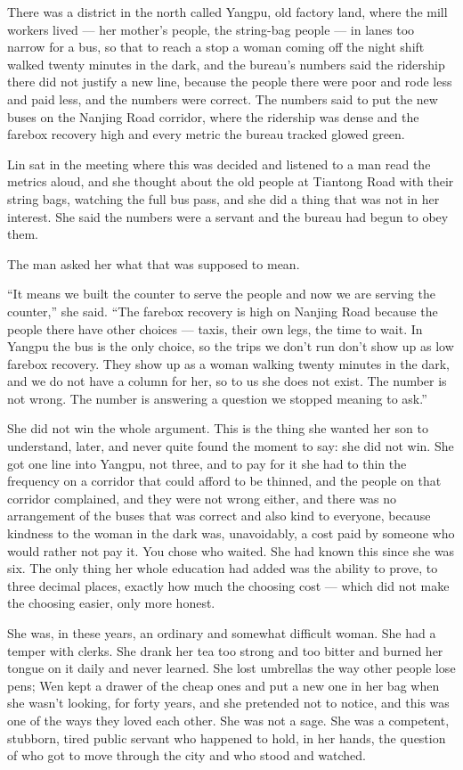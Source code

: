 There was a district in the north called Yangpu, old factory land, where the mill workers lived --- her mother's people, the string-bag people --- in lanes too narrow for a bus, so that to reach a stop a woman coming off the night shift walked twenty minutes in the dark, and the bureau's numbers said the ridership there did not justify a new line, because the people there were poor and rode less and paid less, and the numbers were correct. The numbers said to put the new buses on the Nanjing Road corridor, where the ridership was dense and the farebox recovery high and every metric the bureau tracked glowed green.

Lin sat in the meeting where this was decided and listened to a man read the metrics aloud, and she thought about the old people at Tiantong Road with their string bags, watching the full bus pass, and she did a thing that was not in her interest. She said the numbers were a servant and the bureau had begun to obey them.

The man asked her what that was supposed to mean.

``It means we built the counter to serve the people and now we are serving the counter,'' she said. ``The farebox recovery is high on Nanjing Road because the people there have other choices --- taxis, their own legs, the time to wait. In Yangpu the bus is the only choice, so the trips we don't run don't show up as low farebox recovery. They show up as a woman walking twenty minutes in the dark, and we do not have a column for her, so to us she does not exist. The number is not wrong. The number is answering a question we stopped meaning to ask.''

She did not win the whole argument. This is the thing she wanted her son to understand, later, and never quite found the moment to say: she did not win. She got one line into Yangpu, not three, and to pay for it she had to thin the frequency on a corridor that could afford to be thinned, and the people on that corridor complained, and they were not wrong either, and there was no arrangement of the buses that was correct and also kind to everyone, because kindness to the woman in the dark was, unavoidably, a cost paid by someone who would rather not pay it. You chose who waited. She had known this since she was six. The only thing her whole education had added was the ability to prove, to three decimal places, exactly how much the choosing cost --- which did not make the choosing easier, only more honest.

She was, in these years, an ordinary and somewhat difficult woman. She had a temper with clerks. She drank her tea too strong and too bitter and burned her tongue on it daily and never learned. She lost umbrellas the way other people lose pens; Wen kept a drawer of the cheap ones and put a new one in her bag when she wasn't looking, for forty years, and she pretended not to notice, and this was one of the ways they loved each other. She was not a sage. She was a competent, stubborn, tired public servant who happened to hold, in her hands, the question of who got to move through the city and who stood and watched.

